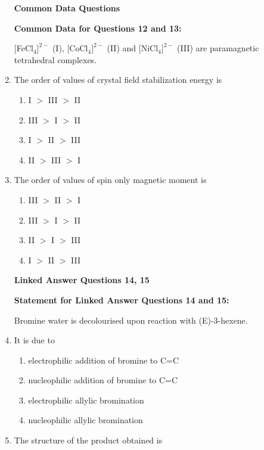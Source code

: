 \documentclass[journal,12pt,onecolumn]{IEEEtran}
\begin{document}
\begin{enumerate}[label=\arabic*.]
\noindent\textbf{Common Data Questions}

\noindent\textbf{Common Data for Questions 12 and 13:}

$[$FeCl$_4]^{2-}$ (I), $[$CoCl$_4]^{2-}$ (II) and $[$NiCl$_4]^{2-}$ (III) are paramagnetic tetrahedral complexes.

\item The order of values of crystal field stabilization energy is
\begin{multicols}{2}
\begin{enumerate}[label=(\Alph*)]
\item I $>$ III $>$ II
\item III $>$ I $>$ II
\item I $>$ II $>$ III
\item II $>$ III $>$ I
\end{enumerate}
\end{multicols}

\item The order of values of spin only magnetic moment is
\begin{multicols}{2}
\begin{enumerate}[label=(\Alph*)]
\item III $>$ II $>$ I
\item III $>$ I $>$ II
\item II $>$ I $>$ III
\item I $>$ II $>$ III
\end{enumerate}
\end{multicols}

\noindent\textbf{Linked Answer Questions 14, 15}

\noindent\textbf{Statement for Linked Answer Questions 14 and 15:}

Bromine water is decolourised upon reaction with (E)-3-hexene.

\item It is due to
\begin{multicols}{2}
\begin{enumerate}[label=(\Alph*)]
\item electrophilic addition of bromine to C=C
\item nucleophilic addition of bromine to C=C
\item electrophilic allylic bromination
\item nucleophilic allylic bromination
\end{enumerate}
\end{multicols}

\item The structure of the product obtained is


\end{enumerate}
\end{document}
